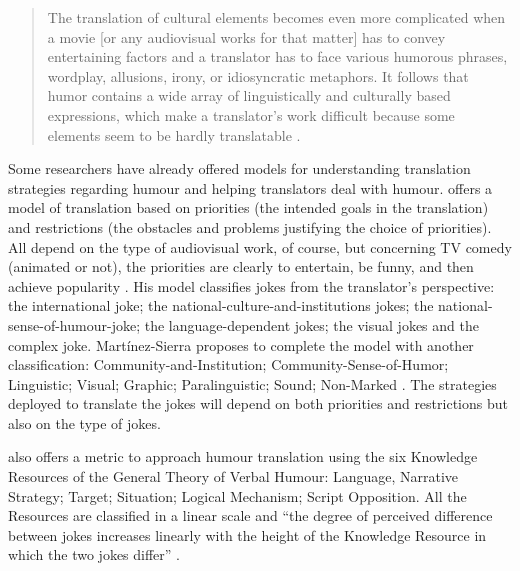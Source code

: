 \documentclass[output=paper]{langscibook}
\begin{document}
\begin{quote}
The translation of cultural elements becomes even more complicated when a movie [or any audiovisual works for that matter] has to convey entertaining factors and a translator has to face various humorous phrases, wordplay, allusions, irony, or idiosyncratic metaphors. It follows that humor contains a wide array of linguistically and culturally based expressions, which make a translator’s work difficult because some elements seem to be hardly translatable \citep{Burczynska2012}.
\end{quote}

Some researchers have already offered models for understanding translation strategies regarding humour and helping translators deal with humour. \citet{Zabalbeascoa1996} offers a model of translation based on priorities (the intended goals in the translation) and restrictions (the obstacles and problems justifying the choice of priorities). All depend on the type of audiovisual work, of course, but concerning TV comedy (animated or not), the priorities are clearly to entertain, be funny, and then achieve popularity \citep[245]{Zabalbeascoa1996}. His model classifies jokes from the translator’s perspective: the international joke; the national-culture-and-institutions jokes; the national-sense-of-humour-joke; the language-dependent jokes; the visual jokes and the complex joke. Martínez-Sierra proposes to complete the model with another classification: Community-and-Institution; Community-Sense-of-Humor; Linguistic; Visual; Graphic; Paralinguistic; Sound; Non-Marked \citep{Martínez-Sierra2006}. The strategies deployed to translate the jokes will depend on both priorities and restrictions but also on the type of jokes.

\citet{Attardo2002} also offers a metric to approach humour translation using the six Knowledge Resources of the General Theory of Verbal Humour: Language, Narrative Strategy; Target; Situation; Logical Mechanism; Script Opposition. All the Resources are classified in a linear scale and “the degree of perceived difference between jokes increases linearly with the height of the Knowledge Resource in which the two jokes differ” \citep[183]{Attardo2002}.
\end{document}
